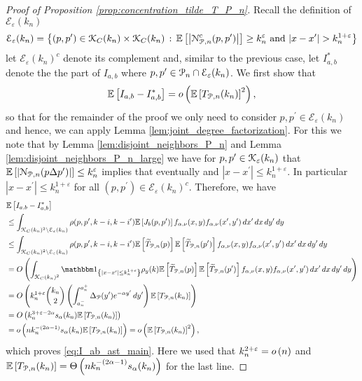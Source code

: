 \begin{proof}[Proof of Proposition \ref{prop:concentration_tilde_T_P_n}]

Recall the definition of $\mathcal{E}_\varepsilon(k_n)$
\[
	\mathcal{E}_{\varepsilon}(k_n) = \left\{(p,p^\prime) \in {\mathcal K}_C(k_n) \times {\mathcal K}_C(k_n) 
	\, : \, \mathbb{E}\left[\left|{\mathcal N}_{{\mathcal P},n}^c(p,p^\prime)\right|\right] \ge k_n^{\varepsilon} \text{ and } |x - x^\prime| > k_n^{1 + \varepsilon} \right\}
\]
let $\mathcal{E}_\varepsilon(k_n)^c$ denote its complement and, similar to the previous case, let $I_{a,b}^\ast$ denote the the part of $I_{a,b}$ where $p,p^\prime \in {\mathcal P}_n \cap \mathcal{E}_\varepsilon(k_n)$. We first show that
\begin{equation}\label{eq:I_ab_ast_main}
	\mathbb{E}\left[I_{a,b} - I_{a,b}^\ast\right] = o\left(\mathbb{E}\left[T_{{\mathcal P},n}(k_n)\right]^2\right),
\end{equation}
so that for the remainder of the proof we only need to consider $p, p^\prime \in \mathcal{E}_\varepsilon(k_n)$ and hence, we can apply Lemma \ref{lem:joint_degree_factorization}. For this we note that by Lemma \ref{lem:disjoint_neighbors_P_n} and Lemma \ref{lem:disjoint_neighbors_P_n_large} we have for $p,p^\prime \in {\mathcal K}_{\varepsilon}(k_n)$ that $\mathbb{E}\left[\left|{\mathcal N}_{{\mathcal P},n}(p\Delta p^\prime)\right|\right] \le k_n^{\varepsilon}$ implies that eventually and $|x-x^\prime| \le k_n^{1+\varepsilon}$. In particular $|x - x^\prime| \le k_n^{1+\varepsilon}$ for all $(p, p^\prime) \in \mathcal{E}_{\varepsilon}(k_n)^c$. Therefore, we have
\begin{align*}
	&\Exp{I_{a,b} - I_{a,b}^\ast}\\
	&\le \int_{\Kcal_C(k_n)^2 \setminus \mathcal{E}_\varepsilon(k_n)} \rho(p, p^\prime, k - i, k - i^\prime) 
		\Exp{J_b(p,p^\prime)} f_{\alpha,\nu}(x,y) f_{\alpha,\nu}(x^\prime,y^\prime) \, dx^\prime \, dx \, dy^\prime \, dy\\
	&\le \int_{\Kcal_C(k_n)^2 \setminus \mathcal{E}_\varepsilon(k_n)} \rho(p, p^\prime, k - i, k - i^\prime) 
		\Exp{\widetilde{T}_{\Pcal,n}(p)}\Exp{\widetilde{T}_{\Pcal,n}(p^\prime)} f_{\alpha,\nu}(x,y) f_{\alpha,\nu}(x^\prime,y^\prime) \, dx^\prime \, dx \, dy^\prime \, dy\\
	&= \bigO{\int_{\Kcal_C(k_n)^2} \ind{|x-x^\prime| \le k_n^{1 + \varepsilon}} \rho_{y}(k) 
		\Exp{\widetilde{T}_{\Pcal,n}(p)}\Exp{\widetilde{T}_{\Pcal,n}(p^\prime)} f_{\alpha,\nu}(x,y) f_{\alpha,\nu}(x^\prime,y^\prime) \, dx^\prime \, dx \, dy^\prime \, dy}\\
	&= \bigO{k_n^{1+\varepsilon} \binom{k_n}{2} \left(\int_{a_n^-}^{a_n^+} \Delta_{\Pcal}(y^\prime) 
			e^{-\alpha y^\prime} \, dy^\prime\right) \Exp{T_{\Pcal,n}(k_n)}}\\
	&= \bigO{k_n^{3 + \varepsilon -2\alpha} s_\alpha(k_n) \Exp{T_{\Pcal,n}(k_n)}}\\
	&= \smallO{n k_n^{-(2\alpha - 1)}s_\alpha(k_n) \Exp{T_{\Pcal,n}(k_n)}} = \smallO{\Exp{T_{\Pcal,n}(k_n)}^2},
\end{align*}
which proves \eqref{eq:I_ab_ast_main}. Here we used that $k_n^{2 + \varepsilon} = o\left(n\right)$ and $\mathbb{E}\left[T_{{\mathcal P},n}(k_n)\right] = \Theta\left(n k_n^{-(2\alpha - 1)}s_\alpha(k_n)\right)$ for the last line.



\end{proof}
